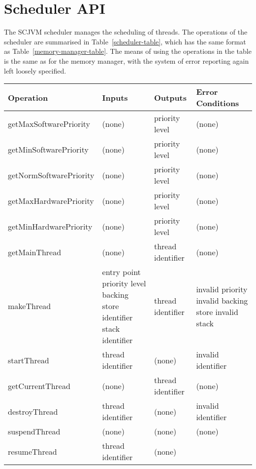 \documentclass[a4paper,10pt]{report}
\begin{document}
\section{Scheduler API}
\label{scheduler-section}

The SCJVM scheduler manages the scheduling of threads.
The operations of the scheduler are summarised in
Table~\ref{scheduler-table}, which has the same format as
Table~\ref{memory-manager-table}.
The means of using the operations in the table is the same as for the
memory manager, with the system of error reporting again left loosely
specified.

\begin{table}[ht]
  \centering
  \footnotesize
  \begin{tabular}{|l|p{3cm}|p{2.2cm}|p{2.7cm}|}
    Operation & Inputs & Outputs & Error Conditions \\
    \hline
    getMaxSoftwarePriority &
    (none) &
    priority level &
    (none)
    \\getMinSoftwarePriority &
    (none) &
    priority level &
    (none)
    \\getNormSoftwarePriority &
    (none) &
    priority level &
    (none)
    \\getMaxHardwarePriority &
    (none) &
    priority level &
    (none)
    \\getMinHardwarePriority &
    (none) &
    priority level &
    (none)
    \\getMainThread &
    (none) &
    thread identifier &
    (none)
    \\makeThread &
    entry point \newline
    priority level \newline
    backing store identifier \newline
    stack identifier &
    thread identifier &
    invalid priority \newline
    invalid backing store \newline
    invalid stack
    \\startThread &
    thread identifier &
    (none) &
    invalid identifier
    \\getCurrentThread &
    (none) &
    thread identifier &
    (none)
    \\destroyThread &
    thread identifier &
    (none) &
    invalid identifier
    \\suspendThread &
    (none) &
    (none) &
    (none)
    \\resumeThread &
    thread identifier &
    (none) &

\end{tabular}
\end{table}
\end{document}
